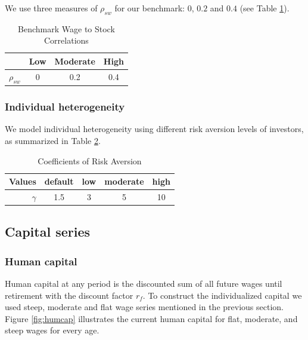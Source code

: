 \documentclass[]{elsarticle}
\begin{document}
We use three measures of $\rho_{sw}$ for our benchmark: $0$, $0.2$ and $0.4$ (see Table \ref{table:wagesec}).


\begin{table}[h!]
	\centering
	\caption{Benchmark Wage to Stock Correlations}
	\label{table:wagesec}
	\begin{tabular}[c]{c|ccc}
		&Low&Moderate&High\\
		\hline
		$\rho_{sw}$&0&0.2&0.4
	\end{tabular}
\end{table}


\subsubsection{Individual heterogeneity}

We model individual heterogeneity using different risk aversion levels of investors, as summarized in Table \ref{table:riskave}.

\begin{table}[h!]
	\centering
	\caption{Coefficients of Risk Aversion}
	\label{table:riskave}
	\begin{tabular}[c]{r|cccc}
		Values&default&low&moderate&high\\
		\hline
		$\gamma$&1.5&3&5&10\\
	\end{tabular}
\end{table}

\subsection{Capital series}

\subsubsection{Human capital}
Human capital at any period is the discounted sum of all future wages until retirement with the discount factor $r_f$. To construct the individualized capital we used steep, moderate and flat wage series mentioned in the previous section. Figure \ref{fig:humcap} illustrates the current human capital for flat, moderate, and steep wages for every age. 
\end{document}
